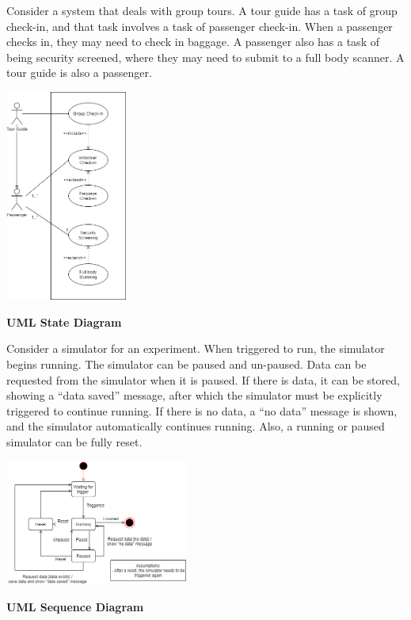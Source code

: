 \documentclass[8pt, letterpaper, titlepage]{article}
\begin{document}
\begin{multicols*}{3}
Consider a system that deals with group tours. A tour guide has a task of group check-in, and that task involves a task of passenger check-in. When a passenger checks in, they may need to check in baggage. A passenger also has a task of being security screened, where they may need to submit to a full body scanner. A tour guide is also a passenger.

\begin{center}
    \includegraphics[width=4cm]{useCase.png}
\end{center}
\textbf{UML State Diagram}

Consider a simulator for an experiment. When triggered to run, the simulator begins running. The simulator can be paused and un-paused. Data can be requested from the simulator when it is paused. If there is data, it can be stored, showing a “data saved” message, after which the simulator must be explicitly triggered to continue running. If there is no data, a “no data” message is shown, and the simulator automatically continues running. Also, a running or paused simulator can be fully reset.
\begin{center}
    \includegraphics[width=6cm]{state.png}
\end{center}
\vfill\null
\columnbreak
\textbf{UML Sequence Diagram}


\end{multicols*}
\end{document}
